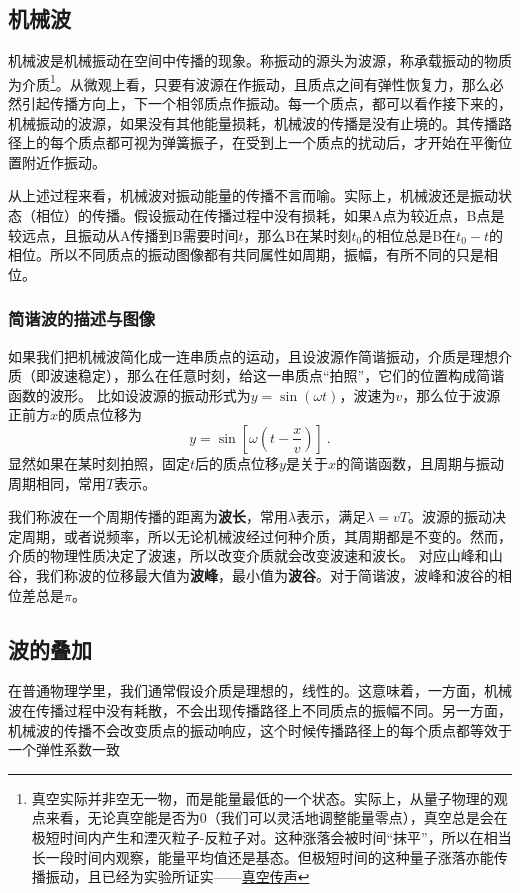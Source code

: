 
\subsection{机械波}
机械波是机械振动在空间中传播的现象。称振动的源头为波源，称承载振动的物质为介质\footnote{真空实际并非空无一物，而是能量最低的一个状态。实际上，从量子物理的观点来看，无论真空能是否为0（我们可以灵活地调整能量零点），真空总是会在极短时间内产生和湮灭粒子-反粒子对。这种涨落会被时间“抹平”，所以在相当长一段时间内观察，能量平均值还是基态。但极短时间的这种量子涨落亦能传播振动，且已经为实验所证实——\href{https://www.rmzxw.com.cn/c/2023-08-25/3399291.shtml}{真空传声}}。从微观上看，只要有波源在作振动，且质点之间有弹性恢复力，那么必然引起传播方向上，下一个相邻质点作振动。每一个质点，都可以看作接下来的，机械振动的波源，如果没有其他能量损耗，机械波的传播是没有止境的。其传播路径上的每个质点都可视为弹簧振子，在受到上一个质点的扰动后，才开始在平衡位置附近作振动。

从上述过程来看，机械波对振动能量的传播不言而喻。实际上，机械波还是振动状态（相位）的传播。假设振动在传播过程中没有损耗，如果A点为较近点，B点是较远点，且振动从A传播到B需要时间$t$，那么B在某时刻$t_0$的相位总是B在$t_0-t$的相位。所以不同质点的振动图像都有共同属性如周期，振幅，有所不同的只是相位。
\subsubsection{简谐波的描述与图像}
如果我们把机械波简化成一连串质点的运动，且设波源作简谐振动，介质是理想介质（即波速稳定），那么在任意时刻，给这一串质点“拍照”，它们的位置构成简谐函数的波形。
比如设波源的振动形式为$y=\sin(\omega t)$，波速为$v$，那么位于波源正前方$x$的质点位移为
\begin{equation}
y=\sin [\omega (t-\frac{x}{v})]~.
\end{equation}
显然如果在某时刻拍照，固定$t$后的质点位移$y$是关于$x$的简谐函数，且周期与振动周期相同，常用$T$表示。%

我们称波在一个周期传播的距离为\textbf{波长}，常用$\lambda $表示，满足$\lambda=vT$。波源的振动决定周期，或者说频率，所以无论机械波经过何种介质，其周期都是不变的。然而，介质的物理性质决定了波速，所以改变介质就会改变波速和波长。
对应山峰和山谷，我们称波的位移最大值为\textbf{波峰}，最小值为\textbf{波谷}。对于简谐波，波峰和波谷的相位差总是$\pi$。

\subsection{波的叠加}
在普通物理学里，我们通常假设介质是理想的，线性的。这意味着，一方面，机械波在传播过程中没有耗散，不会出现传播路径上不同质点的振幅不同。另一方面，机械波的传播不会改变质点的振动响应，这个时候传播路径上的每个质点都等效于一个弹性系数一致

